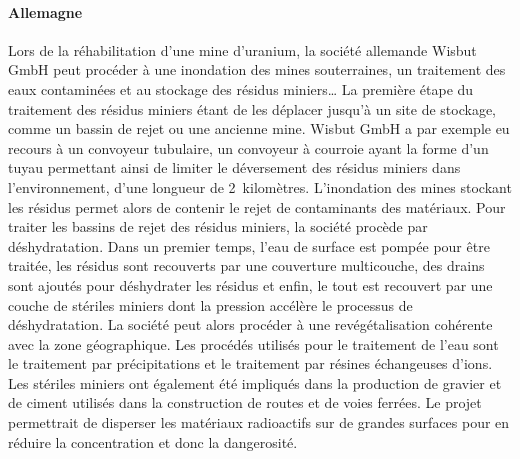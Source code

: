\documentclass{article}
\begin{document}
\paragraph{Allemagne}
Lors de la réhabilitation d’une mine d’uranium, la société allemande Wisbut GmbH peut procéder à une inondation des mines souterraines, un traitement des eaux contaminées et au stockage des résidus miniers… La première étape du traitement des résidus miniers étant de les déplacer jusqu’à un site de stockage, comme un bassin de rejet ou une ancienne mine. Wisbut GmbH a par exemple eu recours à un convoyeur tubulaire, un convoyeur à courroie ayant la forme d’un tuyau permettant ainsi de limiter le déversement des résidus miniers dans l’environnement, d’une longueur de 2~kilomètres. L’inondation des mines stockant les résidus permet alors de contenir le rejet de contaminants des matériaux. Pour traiter les bassins de rejet des résidus miniers, la société procède par déshydratation. Dans un premier temps, l’eau de surface est pompée pour être traitée, les résidus sont recouverts par une couverture multicouche, des drains sont ajoutés pour déshydrater les résidus et enfin, le tout est recouvert par une couche de stériles miniers dont la pression accélère le processus de déshydratation. La société peut alors procéder à une revégétalisation cohérente avec la zone géographique. Les procédés utilisés pour le traitement de l’eau sont le traitement par précipitations et le traitement par résines échangeuses d’ions.
Les stériles miniers ont également été impliqués dans la production de gravier et de ciment utilisés dans la construction de routes et de voies ferrées. Le projet permettrait de disperser les matériaux radioactifs sur de grandes surfaces pour en réduire la concentration et donc la dangerosité.
\end{document}
